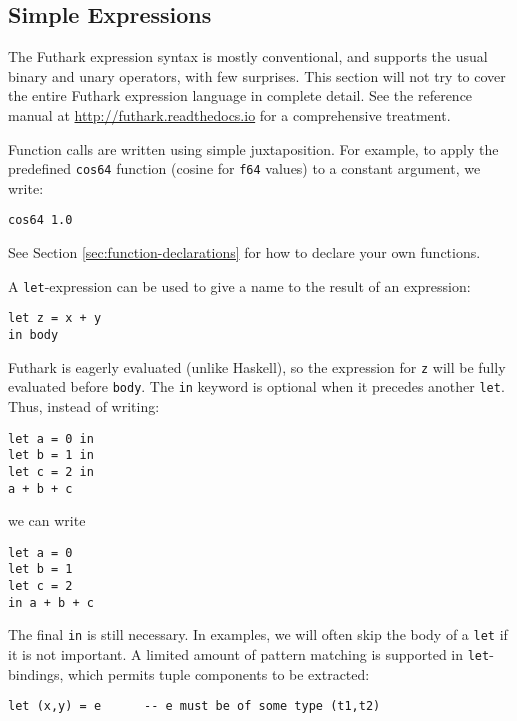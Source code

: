 \documentclass[11pt]{book}
\begin{document}
\subsection{Simple Expressions}

The Futhark expression syntax is mostly conventional, and supports the
usual binary and unary operators, with few surprises.  This section
will not try to cover the entire Futhark expression language in
complete detail.  See the reference manual at
\url{http://futhark.readthedocs.io} for a comprehensive treatment.

Function calls are written using simple juxtaposition.  For example,
to apply the predefined \texttt{cos64} function (cosine for
\texttt{f64} values) to a constant argument, we write:

\begin{lstlisting}
cos64 1.0
\end{lstlisting}

\noindent
See Section \ref{sec:function-declarations} for how to declare your
own functions.

A \texttt{let}-expression can be used to give a name to the result of
an expression:

\begin{lstlisting}
let z = x + y
in body
\end{lstlisting}

Futhark is eagerly evaluated (unlike Haskell), so the expression for
\texttt{z} will be fully evaluated before \texttt{body}.  The \texttt{in} keyword is optional when it precedes another
\texttt{let}.  Thus, instead of writing:

\begin{lstlisting}
let a = 0 in
let b = 1 in
let c = 2 in
a + b + c
\end{lstlisting}

\noindent
we can write

\begin{lstlisting}
let a = 0
let b = 1
let c = 2
in a + b + c
\end{lstlisting}

\noindent
The final \texttt{in} is still necessary.  In examples, we will often
skip the body of a \texttt{let} if it is not important.  A limited
amount of pattern matching is supported in \texttt{let}-bindings,
which permits tuple components to be extracted:

\begin{lstlisting}
let (x,y) = e      -- e must be of some type (t1,t2)
\end{lstlisting}
\end{document}
